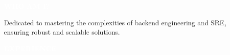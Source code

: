 \documentclass[9pt]{developercv} %
\renewcommand{\cvsect}[1]{%
    \vspace{\baselineskip} %
    \colorbox{primary}{\textcolor{white}{\MakeUppercase{\textbf{#1}}}}\\%
}
\begin{document}
\cvsect{Who Am I?}

\begin{minipage}[t]{0.4\textwidth} %
    \vspace{-\baselineskip} %
    
    Dedicated to mastering the complexities of backend engineering and SRE, ensuring robust and scalable solutions.
\end{minipage}
\hfill %
\begin{minipage}[t]{0.5\textwidth} %
    \vspace{-\baselineskip} %
    \begin{barchart}{5.5}
    \end{barchart}
\end{minipage}

\begin{center}
\end{center}


\cvsect{Experience}
\end{document}
